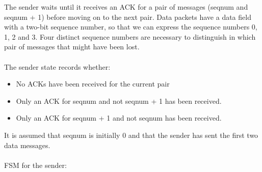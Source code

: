 The sender waits until it receives an ACK for a pair of messages (seqnum and seqnum + 1) before moving on to the next pair. Data packets have a data field with a two-bit sequence number, so that we can express the sequence numbers 0, 1, 2 and 3. Four distinct sequence numbers are necessary to distinguish in which pair of messages that might have been lost. \\
\\
The sender state records whether:
\begin{itemize}
    \item No ACKs have been received for the current pair
    \item Only an ACK for seqnum and not seqnum + 1 has been received.
    \item Only an ACK for seqnum + 1 and not seqnum has been received.
\end{itemize}
It is assumed that seqnum is initially 0 and that the sender has sent the first two data messages. \\
\\
FSM for the sender: \\
